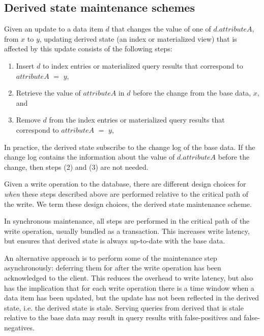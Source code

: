 \subsection{Derived state maintenance schemes}
\label{sec:sync_async_maintenance}


Given an update to a data item $d$ that changes the value of one of $d.attributeA$, from $x$ to $y$,
updating derived state (an index or materialized view) that is affected by this update consists of the following steps:
\begin{enumerate}
  \item Insert $d$ to index entries or materialized query results that correspond to $attributeA$ $=$ $y$,
  \item Retrieve the value of $attributeA$ in $d$ before the change from the base data, $x$, and
  \item Remove $d$ from the index entries or materialized query results that correspond to $attributeA$ $=$ $y$,
\end{enumerate}

In practice, the derived state subscribe to the change log of the base data.
If the change log contains the information about the value of $d.attributeA$ before the change, then steps (2) and (3)
are not needed.

\medskip

Given a write operation to the database,
there are different design choices for \textit{when} these steps described above are performed relative to the critical
path of the write.
We term these design choices, the derived state maintenance scheme.

In synchronous maintenance, all steps are performed in the critical path of the write operation,
usually bundled as a transaction.
This increases write latency, but ensures that derived state is always up-to-date with the base data.

An alternative approach is to perform some of the maintenance step asynchronously: deferring them for after the write
operation has been acknowledged to the client.
This reduces the overhead to write latency, but also has the implication that for each write operation
there is a time window when a data item has been updated, but the update has not been reflected in the derived state,
i.e. the derived state is stale.
Serving queries from derived that is stale relative to the base data may result in query results with false-positives
and false-negatives.

